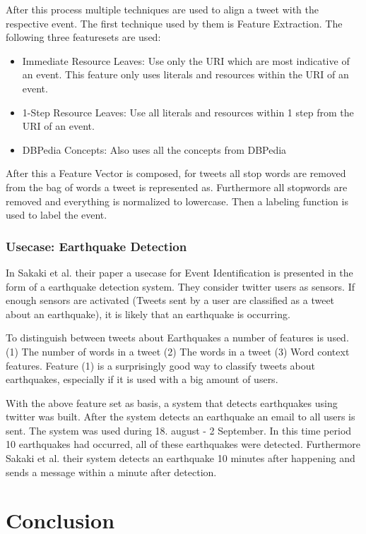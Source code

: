 \documentclass{article}
\begin{document}
After this process multiple techniques are used to align a tweet with the respective event. The first technique used by them is Feature Extraction. \cite{eventalign} The following three featuresets are used:
\begin{itemize}

  \item Immediate Resource Leaves: Use only the URI which are most indicative of an event. This feature only uses literals and resources within the URI of an event. 
  \item 1-Step Resource Leaves: Use all literals and resources within 1 step from the URI of an event. 
  \item DBPedia Concepts: Also uses all the concepts from DBPedia 
\end{itemize}
After this a Feature Vector is composed, for tweets all stop words are removed from the bag of words a tweet is represented as. Furthermore all stopwords are removed and everything is normalized to lowercase. \cite{eventalign} Then a labeling function is used to label the event. 
\subsubsection{Usecase: Earthquake Detection}
In Sakaki et al. their paper a usecase for Event Identification is presented in the form of a earthquake detection system. \cite{earthq} They consider twitter users as sensors. If enough sensors are activated (Tweets sent by a user are classified as a tweet about an earthquake), it is likely that an earthquake is occurring. 

To distinguish between tweets about Earthquakes a number of features is used. (1) The number of words in a tweet (2) The words in a tweet (3) Word context features. Feature (1) is a surprisingly good way to classify tweets about earthquakes, especially if it is used with a big amount of users. 

With the above feature set as basis, a system that detects earthquakes using twitter was built. After the system detects an earthquake an email to all users is sent. The system was used during 18. august - 2 September. In this time period 10 earthquakes had occurred, all of these earthquakes were detected. Furthermore Sakaki et al. their system detects an earthquake 10 minutes after happening and sends a message within a minute after detection. 
\cite{earthq}
\newpage

\section{Conclusion}

\newpage



\end{document}
